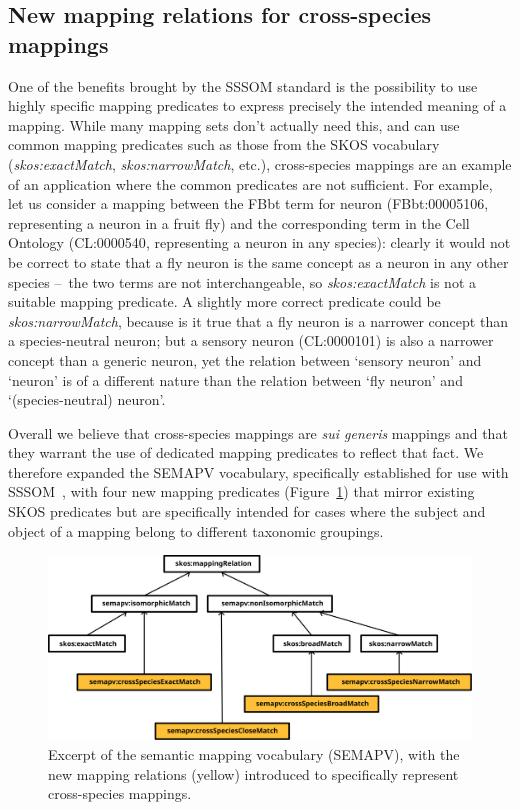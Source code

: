 \documentclass{ceurart}
\def\term#1{`#1'}
\def\property#1{\textit{#1}}
\def\curie#1{\textsf{#1}}
\begin{document}
\subsection{New mapping relations for cross-species mappings}

One of the benefits brought by the SSSOM standard is the possibility to
use highly specific mapping predicates to express precisely the intended
meaning of a mapping. While many mapping sets don’t actually need this,
and can use common mapping predicates such as those from the SKOS
vocabulary~\cite{bechhofer2009} (\property{skos:exactMatch},
\property{skos:narrowMatch}, etc.), cross-species mappings are an
example of an application where the common predicates are not
sufficient. For example, let us consider a mapping between the FBbt term
for neuron (\curie{FBbt:00005106}, representing a neuron in a fruit fly)
and the corresponding term in the Cell Ontology (\curie{CL:0000540},
representing a neuron in any species): clearly it would not be correct
to state that a fly neuron is the same concept as a neuron in any other
species --~the two terms are not interchangeable, so
\property{skos:exactMatch} is not a suitable mapping predicate.  A
slightly more correct predicate could be \property{skos:narrowMatch},
because is it true that a fly neuron is a narrower concept than a
species-neutral neuron; but a sensory neuron (\curie{CL:0000101}) is
also a narrower concept than a generic neuron, yet the relation between
\term{sensory neuron} and \term{neuron} is of a different nature than
the relation between \term{fly neuron} and \term{(species-neutral)
neuron}.

Overall we believe that cross-species mappings are \emph{sui generis}
mappings and that they warrant the use of dedicated mapping predicates
to reflect that fact. We therefore expanded the SEMAPV vocabulary,
specifically established for use with SSSOM~\cite{matentzoglu2022}, with
four new mapping predicates (Figure~\ref{fig:relations}) that mirror
existing SKOS predicates but are specifically intended for cases where
the subject and object of a mapping belong to different taxonomic
groupings.

\begin{figure}
  \centering
  \includegraphics[width=.8\linewidth]{relations}
  \caption{Excerpt of the semantic mapping vocabulary (SEMAPV), with the
  new mapping relations (yellow) introduced to specifically represent
  cross-species mappings.}
  \label{fig:relations}
\end{figure}
\end{document}
